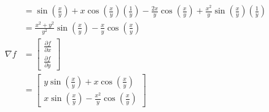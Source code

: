 \begin{enumerate}
\begin{align*}
   &= \sin(\frac{x}{y}) + x\cos(\frac{x}{y})(\frac{1}{y}) - \frac{2x}{y}\cos(\frac{x}{y}) + \frac{x^2}{y}\sin(\frac{x}{y})(\frac{1}{y}) \\
   &= \frac{x^2+y^2}{y^2}\sin(\frac{x}{y}) - \frac{x}{y}\cos(\frac{x}{y}) \\
   \nabla f
   &= \begin{bmatrix}
       \frac{\partial f}{\partial x} \\
       \frac{\partial f}{\partial y}
      \end{bmatrix} \\
   &= \begin{bmatrix}
       y\sin(\frac{x}{y}) + x\cos(\frac{x}{y}) \\
       x\sin(\frac{x}{y}) - \frac{x^2}{y}\cos(\frac{x}{y})
      \end{bmatrix}
  \end{align*}


\end{enumerate}

